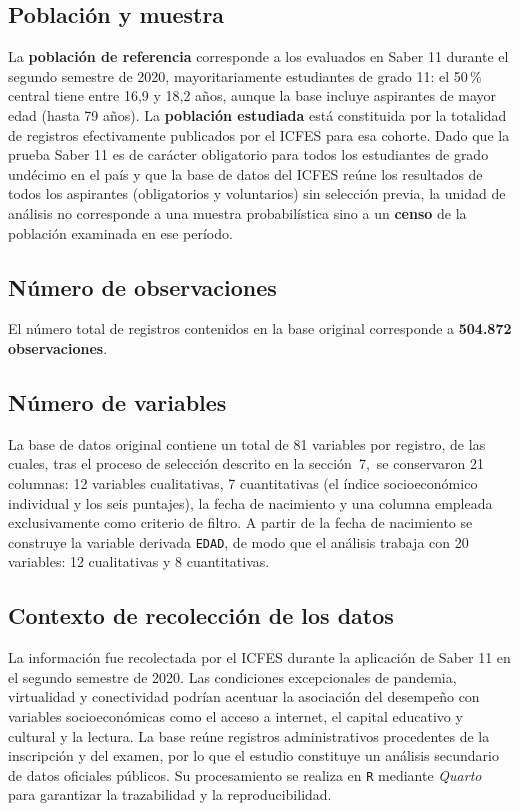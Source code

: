 \documentclass[12pt]{article}
\newcommand{\corr}[1]{\textcolor{azulcorr}{#1}}
\begin{document}
\subsection{Población y muestra}

La \textbf{población de referencia} corresponde a \corr{los evaluados en Saber 11
durante el segundo semestre de 2020, mayoritariamente estudiantes de grado 11: el 50\,\%
central tiene entre 16,9 y 18,2 años, aunque la base incluye aspirantes de mayor edad
(hasta 79 años).} La \textbf{población estudiada}
está constituida por la totalidad de registros efectivamente publicados por
el ICFES para esa cohorte. Dado que la prueba Saber 11 es de
carácter obligatorio para todos los estudiantes de grado undécimo en el
país y que la base de datos del ICFES reúne los resultados de todos los
aspirantes (obligatorios y voluntarios) sin selección previa, la unidad
de análisis no corresponde a una muestra probabilística sino a un \textbf{censo}
de la población examinada en ese período.

\subsection{Número de observaciones}
El número total de registros contenidos en la base original corresponde a \textbf{504.872 observaciones}.

\subsection{Número de variables}
La base de datos original contiene un total de 81 variables por registro,
de las cuales, tras el proceso de selección descrito en la sección~7,\  \corr{se conservaron 21 columnas: 12 variables cualitativas, 7 cuantitativas
(el índice socioeconómico individual y los seis puntajes), la fecha de nacimiento y una
columna empleada exclusivamente como criterio de filtro. A partir de la fecha de nacimiento
se construye la variable derivada \texttt{EDAD}, de modo que el análisis trabaja con
20 variables: 12 cualitativas y 8 cuantitativas.}

\subsection{Contexto de recolección de los datos}
La información fue recolectada por el ICFES durante la aplicación de Saber 11 en el
segundo semestre de 2020. Las condiciones excepcionales de pandemia, virtualidad y
conectividad podrían acentuar la asociación del desempeño con variables socioeconómicas
como el acceso a internet, el capital educativo y cultural y la lectura. La base reúne
registros administrativos procedentes de la inscripción y del examen, por lo que el
estudio constituye un análisis secundario de datos oficiales públicos. Su procesamiento
se realiza en \texttt{R} mediante \textit{Quarto} para garantizar la trazabilidad y la
reproducibilidad.
\end{document}
